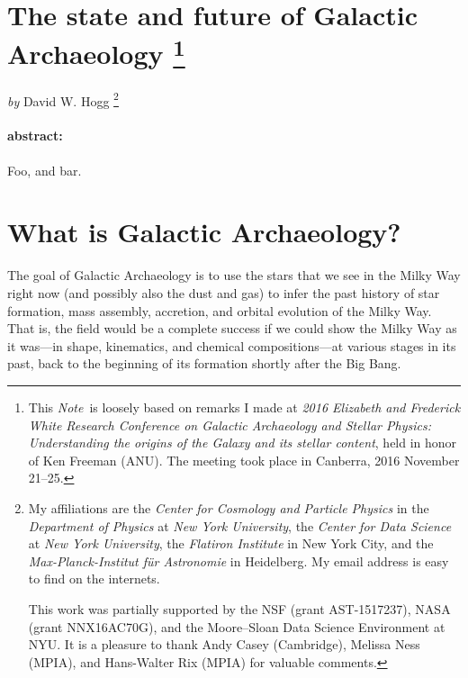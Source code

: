 \documentclass[11pt, letterpaper]{article}
\newcommand{\documentname}{\textsl{Note}}
\begin{document}
\section*{The state and future of Galactic Archaeology%
\footnote{This \documentname\ is loosely based on remarks I made at
  \textsl{2016 Elizabeth and Frederick White Research Conference on
    Galactic Archaeology and Stellar Physics: Understanding the
    origins of the Galaxy and its stellar content}, held in honor of
  Ken Freeman (ANU). The meeting took place in Canberra, 2016 November 21--25.\label{foot:conference}}}

\noindent
\textit{by} {David W. Hogg}%
\footnote{My affiliations are the \textsl{Center for Cosmology and
    Particle Physics} in the \textsl{Department of Physics} at \textsl{New York University}, the
  \textsl{Center for Data Science} at \textsl{New York University}, the
  \textsl{Flatiron Institute} in New York City, and the
  \textsl{Max-Planck-Institut f\"ur Astronomie} in Heidelberg. My email address
  is easy to find on the internets.
  
  This work
  was partially supported by the NSF (grant AST-1517237), NASA (grant
  NNX16AC70G), and the Moore--Sloan Data Science Environment at
  NYU. It is a pleasure to thank Andy Casey (Cambridge), Melissa Ness
  (MPIA), and Hans-Walter Rix (MPIA) for valuable comments.}

\paragraph{abstract:}
Foo, and bar.

\section{What is Galactic Archaeology?}

The goal of Galactic Archaeology is to
use the stars that we see in the Milky Way right now (and possibly
also the dust and gas) to infer the past history of star formation,
mass assembly, accretion, and orbital evolution of the Milky Way. That
is, the field would be a complete success if we could show the Milky
Way as it was---in shape, kinematics, and chemical compositions---at
various stages in its past, back to the beginning of its formation
shortly after the Big Bang.
\end{document}
